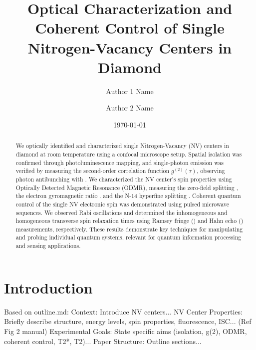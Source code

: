 \documentclass[aps,prb,twocolumn,superscriptaddress,floatfix,longbibliography,citeautoscript]{revtex4-2}
\newcommand{\mytitle}{Optical Characterization and Coherent Control of Single Nitrogen-Vacancy Centers in Diamond}
\begin{document}
\title{\mytitle}

\author{Author 1 Name}
\author{Author 2 Name}

\date{\today}

\begin{abstract}

We optically identified and characterized single Nitrogen-Vacancy (NV) 
centers in diamond at room temperature using a confocal microscope setup. Spatial isolation was confirmed through photoluminescence mapping, and single-photon emission was verified by measuring the second-order correlation function $g^{(2)}(\tau)$, observing photon antibunching with . We characterized the NV center's spin properties using Optically Detected Magnetic Resonance (ODMR), measuring the zero-field splitting , 
the electron gyromagnetic ratio . 
and the N-14 hyperfine splitting . 
Coherent quantum control of the single NV electronic spin was demonstrated using pulsed microwave sequences. 
We observed Rabi oscillations and determined the inhomogeneous and homogeneous transverse spin relaxation times using Ramsey fringe 
() and Hahn echo () measurements, respectively. 
These results demonstrate key techniques for manipulating and probing individual quantum systems, 
relevant for quantum information processing and sensing applications.

\end{abstract}

\maketitle

\section{\label{sec:intro}Introduction}
Based on outline.md:
Context: Introduce NV centers...
NV Center Properties: Briefly describe structure, energy levels, spin properties, fluorescence, ISC... (Ref Fig 2 manual)
Experimental Goals: State specific aims (isolation, g(2), ODMR, coherent control, T2*, T2)...
Paper Structure: Outline sections...
\end{document}
